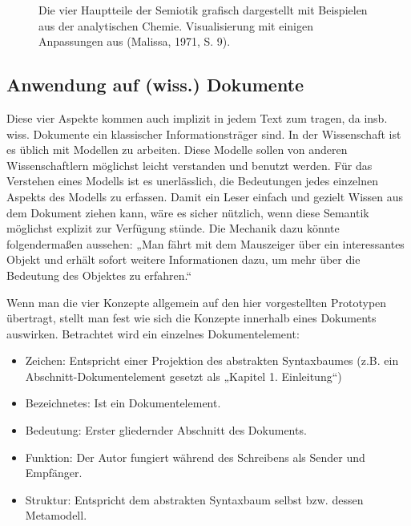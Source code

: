  
\begin{figure}[h!]
\centering
\advance\leftskip-2.5cm
\caption{ Die vier Hauptteile der Semiotik grafisch dargestellt mit Beispielen aus der analytischen Chemie. Visualisierung mit einigen Anpassungen aus (Malissa, 1971, S. 9). }\label{semiotik}
\end{figure}
 
\subsection{Anwendung auf (wiss.) Dokumente}\label{}
 
Diese vier Aspekte kommen auch implizit in jedem Text zum tragen, da insb. wiss. Dokumente ein klassischer Informationsträger sind. In der Wissenschaft ist es üblich mit Modellen zu arbeiten. Diese Modelle sollen von anderen Wissenschaftlern möglichst leicht verstanden und benutzt werden. Für das Verstehen eines Modells ist es unerlässlich, die Bedeutungen jedes einzelnen Aspekts des Modells zu erfassen. Damit ein Leser einfach und gezielt Wissen aus dem Dokument ziehen kann, wäre es sicher nützlich, wenn diese Semantik möglichst explizit zur Verfügung stünde. Die Mechanik dazu könnte folgendermaßen aussehen: „Man fährt mit dem Mauszeiger über ein interessantes Objekt und erhält sofort weitere Informationen dazu, um mehr über die Bedeutung des Objektes zu erfahren.“

 
Wenn man die vier Konzepte allgemein auf den hier vorgestellten Prototypen übertragt, stellt man fest wie sich die Konzepte innerhalb eines Dokuments auswirken. Betrachtet wird ein einzelnes Dokumentelement:

 
\begin{itemize}

\item Zeichen: Entspricht einer Projektion des abstrakten Syntaxbaumes (z.B. ein Abschnitt-Dokumentelement gesetzt als „Kapitel 1. Einleitung“)
\item Bezeichnetes: Ist ein Dokumentelement.
\item Bedeutung: Erster gliedernder Abschnitt des Dokuments.
\item Funktion: Der Autor fungiert während des Schreibens als Sender und Empfänger.
\item Struktur: Entspricht dem abstrakten Syntaxbaum selbst bzw. dessen Metamodell.
\end{itemize}
 
